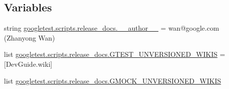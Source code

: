 \subsection*{Variables}
\begin{DoxyCompactItemize}
\item 
string \mbox{\hyperlink{namespacegoogletest_1_1scripts_1_1release__docs_a1aaddf6a50ed46fae64701f4322208b2}{googletest.\+scripts.\+release\+\_\+docs.\+\_\+\+\_\+author\+\_\+\+\_\+}} = \textquotesingle{}wan@google.\+com (Zhanyong Wan)\textquotesingle{}
\item 
list \mbox{\hyperlink{namespacegoogletest_1_1scripts_1_1release__docs_a6ba6e2968a5fefecf7ed0cfd55f85aed}{googletest.\+scripts.\+release\+\_\+docs.\+G\+T\+E\+S\+T\+\_\+\+U\+N\+V\+E\+R\+S\+I\+O\+N\+E\+D\+\_\+\+W\+I\+K\+IS}} = \mbox{[}\textquotesingle{}Dev\+Guide.\+wiki\textquotesingle{}\mbox{]}
\item 
list \mbox{\hyperlink{namespacegoogletest_1_1scripts_1_1release__docs_a8b57a1659682435ab16fadfbe7f61660}{googletest.\+scripts.\+release\+\_\+docs.\+G\+M\+O\+C\+K\+\_\+\+U\+N\+V\+E\+R\+S\+I\+O\+N\+E\+D\+\_\+\+W\+I\+K\+IS}}
\end{DoxyCompactItemize}
